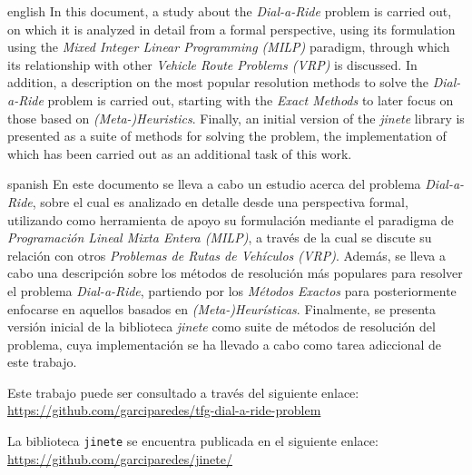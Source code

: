\documentclass{subfiles}
\newenvironment{abstractpage}
  {\cleardoublepage\vspace*{\fill}\thispagestyle{empty}}
  {\vfill\cleardoublepage}
\newenvironment{abstract-lang}[1]
  {\bigskip\selectlanguage{#1}%
   \begin{center}\bfseries\abstractname\end{center}}
  {\par\bigskip}
\begin{document}
  \begin{abstractpage}
    \begin{abstract-lang}{english}
      In this document, a study about the \emph{Dial-a-Ride} problem is carried out, on which it is analyzed in detail from a formal perspective, using its formulation using the \emph{Mixed Integer Linear Programming (MILP)} paradigm, through which its relationship with other \emph{Vehicle Route Problems (VRP)} is discussed. In addition, a description on the most popular resolution methods to solve the \emph{Dial-a-Ride} problem is carried out, starting with the \emph{Exact Methods} to later focus on those based on \emph{(Meta-)Heuristics}. Finally, an initial version of the \emph{jinete} library is presented as a suite of methods for solving the problem, the implementation of which has been carried out as an additional task of this work.
    \end{abstract-lang}
    \begin{abstract-lang}{spanish}
      En este documento se lleva a cabo un estudio acerca del problema \emph{Dial-a-Ride}, sobre el cual es analizado en detalle desde una perspectiva formal, utilizando como herramienta de apoyo su formulación mediante el paradigma de \emph{Programación Lineal Mixta Entera (MILP)}, a través de la cual se discute su relación con otros \emph{Problemas de Rutas de Vehículos (VRP)}. Además, se lleva a cabo una descripción sobre los métodos de resolución más populares para resolver el problema \emph{Dial-a-Ride}, partiendo por los \emph{Métodos Exactos} para posteriormente enfocarse en aquellos basados en \emph{(Meta-)Heurísticas}. Finalmente, se presenta versión inicial de la biblioteca \emph{jinete} como suite de métodos de resolución del problema, cuya implementación se ha llevado a cabo como tarea adiccional de este trabajo.
    \end{abstract-lang}

    \bigskip
    \centering
    Este trabajo puede ser consultado a través del siguiente enlace: \url{https://github.com/garciparedes/tfg-dial-a-ride-problem}

    \bigskip
    La biblioteca \texttt{jinete} se encuentra publicada en el siguiente enlace: \url{https://github.com/garciparedes/jinete/}

  \end{abstractpage}
\end{document}
